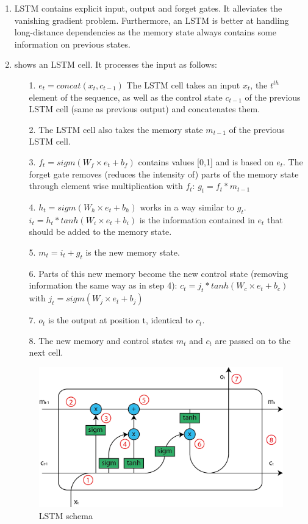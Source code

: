 \begin{solution}
    \begin{enumerate}
        \item LSTM contains explicit input, output and forget gates. It alleviates the vanishing gradient problem. Furthermore, an LSTM is better at handling long-distance dependencies as the memory state always contains some information on previous states.
        \item {} shows an LSTM cell. It processes the input as follows:
        \begin{enumerate}
            \item[1.] $e_t = concat(x_t,c_{t-1})$ The LSTM cell takes an input $x_t$, the $t^{th}$ element of the sequence, as well as the control state $c_{t-1}$ of the previous LSTM cell (same as previous output) and concatenates them. 
            \item[2.] The LSTM cell also takes the memory state $m_{t-1}$ of the previous LSTM cell.
            \item[3.] $f_t = sigm(W_f\times e_t + b_f)$ contains values [0,1] and is based on $e_t$. The forget gate removes (reduces the intensity of) parts of the memory state through element wise multiplication with $f_t$: $g_t = f_t * m_{t-1}$
            \item[4.] $h_t = sigm(W_h\times e_t + b_h)$ works in a way similar to $g_t$. $i_t = h_t * tanh(W_i \times e_t + b_i)$ is the information contained in $e_t$ that should be added to the memory state.
            \item[5.] $m_t = i_t + g_t$ is the new memory state.
            \item[6.] Parts of this new memory become the new control state (removing information the same way as in step 4): $c_t = j_t * tanh(W_c \times e_t + b_c)$ with $j_t = sigm(W_j\times e_t + b_j)$
            \item[7.] $o_t$ is the output at position t, identical to $c_t$.
            \item[8.] The new memory and control states $m_t$ and $c_t$ are passed on to the next cell.
        \end{enumerate}
        \begin{figure} [h]
            \centering
            \includegraphics{img/LSTM.png}
            \caption{LSTM schema}
            \label{fig:lstm_schema}
        \end{figure}
    \end{enumerate}
\end{solution}

